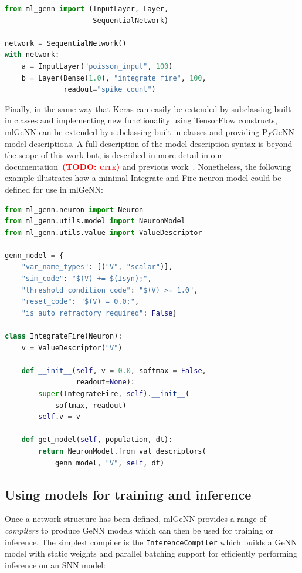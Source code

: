 \documentclass[sigconf]{acmart}
\newcommand{\todo}[1]{\textbf{\textsc{\textcolor{red}{(TODO: #1)}}}}
\begin{document}
\begin{lstlisting}[language=Python]
from ml_genn import (InputLayer, Layer,
                     SequentialNetwork)

network = SequentialNetwork()
with network:
    a = InputLayer("poisson_input", 100)
    b = Layer(Dense(1.0), "integrate_fire", 100,
              readout="spike_count")
\end{lstlisting}

Finally, in the same way that Keras can easily be extended by subclassing built in classes and implementing new functionality using TensorFlow constructs, mlGeNN can be extended by subclassing  built in classes and providing PyGeNN model descriptions. 
A full description of the model description syntax is beyond the scope of this work but, is described in more detail in our documentation~\todo{cite} and previous work~\citep{Knight2021}.
Nonetheless, the following example illustrates how a minimal Integrate-and-Fire neuron model could be defined for use in mlGeNN:

\begin{lstlisting}[language=Python]
from ml_genn.neuron import Neuron
from ml_genn.utils.model import NeuronModel
from ml_genn.utils.value import ValueDescriptor

genn_model = {
    "var_name_types": [("V", "scalar")],
    "sim_code": "$(V) += $(Isyn);",
    "threshold_condition_code": "$(V) >= 1.0",
    "reset_code": "$(V) = 0.0;",
    "is_auto_refractory_required": False}

class IntegrateFire(Neuron):
    v = ValueDescriptor("V")

    def __init__(self, v = 0.0, softmax = False, 
                 readout=None):
        super(IntegrateFire, self).__init__(
            softmax, readout)
        self.v = v

    def get_model(self, population, dt):
        return NeuronModel.from_val_descriptors(
            genn_model, "V", self, dt)
\end{lstlisting}


\subsection{Using models for training and inference}
Once a network structure has been defined, mlGeNN provides a range of \emph{compilers} to produce GeNN models which can then be used for training or inference.
The simplest compiler is the \lstinline{InferenceCompiler} which builds a GeNN model with static weights and parallel batching support for efficiently performing inference on an SNN model:
\end{document}
